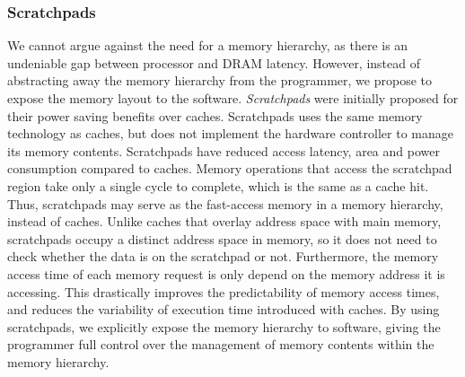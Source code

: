 \subsubsection{Scratchpads}
We cannot argue against the need for a memory hierarchy, as there is an undeniable gap between processor and DRAM latency.
However, instead of abstracting away the memory hierarchy from the programmer, we propose to expose the memory layout to the software.  
\emph{Scratchpads} were initially proposed for their power saving benefits over caches.
Scratchpads uses the same memory technology as caches, but does not implement the hardware controller to manage its memory contents.
Scratchpads have reduced access latency, area and power consumption compared to caches. 
Memory operations that access the scratchpad region take only a single cycle to complete, which is the same as a cache hit.
Thus, scratchpads may serve as the fast-access memory in a memory hierarchy, instead of caches. 
Unlike caches that overlay address space with main memory, scratchpads occupy a distinct address space in memory, so it does not need to check whether the data is on the scratchpad or not. 
Furthermore, the memory access time of each memory request is only depend on the memory address it is accessing. 
This drastically improves the predictability of memory access times, and reduces the variability of execution time introduced with caches.  
By using scratchpads, we explicitly expose the memory hierarchy to software, giving the programmer full control over the management of memory contents within the memory hierarchy.

